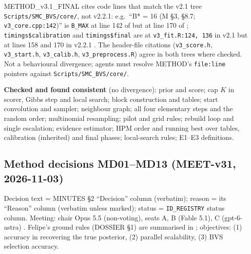 \begin{divergence}
METHOD\_v3.1\_FINAL cites code lines that match the v2.1 tree \texttt{Scripts/SMC\_BVS/core/}, not v2.2.1: e.g.\ ``B* = 16 (M §3,
§8.7; \texttt{v3\_core.cpp:142})''  is \texttt{B\_MAX} at line 142 of
 but at line 170 of
; \texttt{timings\$calibration} and
\texttt{timings\$final} are at \texttt{v3\_fit.R:124, 136} in v2.1  but at lines 158 and 170 in
v2.2.1 . The header-file citations
(\texttt{v3\_score.h}, \texttt{v3\_start.h}, \texttt{v3\_calib.h}, \texttt{v3\_preprocess.R}) agree in both trees where checked. Not a
behavioural divergence; agents must resolve METHOD's \texttt{file:line} pointers against \texttt{Scripts/SMC\_BVS/core/}.
\end{divergence}

\textbf{Checked and found consistent} (no divergence): prior and score; cap $K$ in scorer, Gibbs step and local search;
block construction and tables; start convolution and sampler; neighbour graph; all four elementary steps and the random
order; multinomial resampling; pilot and grid rules; rebuild loop and single escalation; evidence estimator; HPM order and
running best over tables, calibration (inherited) and final phases; local-search rules; E1--E3 definitions.

\subsection{Method decisions MD01--MD13 (MEET-v31, 2026-11-03)}\label{sec:method-md}

Decision text = MINUTES \S2 ``Decision'' column (verbatim); reason = its ``Reason'' column (verbatim unless marked);
status = \texttt{ID\_REGISTRY} status column. Meeting: chair Opus 5.5 (non-voting), seats A, B (Fable 5.1), C (gpt-6-astra)
. Felipe's ground rules (DOSSIER \S1) are summarised in
; objectives: (1) accuracy in recovering the true posterior, (2) parallel
scalability, (3) BVS selection accuracy.

\newcommand{\mdbody}[4]{\ \textbf{#1}\quad \status{#2}\par
\noindent\emph{Decision.} #3\par\noindent\emph{Reason.} #4\par}

